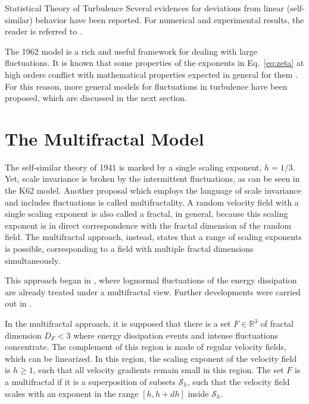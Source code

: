 \begin{chapter}{Statistical Theory of Turbulence}
Several evidences for deviations from
linear (self-similar) behavior have been reported.
For numerical and experimental results, the reader is referred to
\textcite{ishihara2009,benzi2010inertial,sinhuber2017dissipative,iyer2017reynolds,reinke2018universal}.

The 1962 model is a rich and useful framework for dealing with
large fluctuations. It is known that some
properties of the exponents in Eq.~\eqref{eq:zeta}
at high orders
conflict with mathematical properties expected in general for
them \parencite{frisch1995}.
For this reason, more general models for fluctuations in
turbulence have been proposed, which are discussed in the next section.

\section{The Multifractal Model} \label{sec:multifractal}

The self-similar theory of 1941 is marked by a single scaling
exponent, $h=1/3$. Yet, scale invariance is broken by the
intermittent fluctuations, as can be seen in the K62 model.
Another proposal which employs the language of scale invariance
and includes fluctuations is called multifractality.
A random velocity field with a single scaling exponent is also called
a fractal, in general, because this scaling exponent is in direct correspondence
with the fractal dimension of the random field.
The multifractal approach, instead, states that
a range of scaling exponents is possible, corresponding to
a field with multiple fractal dimensions simultaneously.

This approach began in \textcite{mandelbrot1974intermittent},
where lognormal fluctuations of the energy dissipation
are already treated under a multifractal view.
Further developments were carried out in
\textcite{frisch1985singularity,meneveau1987multifractal, meneveau1991multifractal}.

In the multifractal approach, it is supposed that there is a set
$F \in \mathbb{R}^3$ of fractal dimension
$D_F < 3$
where energy dissipation events and intense fluctuations concentrate.
The complement of this region is made of regular velocity fields,
which can be linearized. In this region, the scaling exponent of
the velocity field is $h \geq 1$,
such that all velocity gradients remain small in this region.
The set $F$ is a multifractal if it is a superposition of subsets $\mathcal{S}_h$,
such that the velocity field scales with an exponent in the range
$[h,h+dh]$ inside $\mathcal{S}_h$.


\end{chapter}
